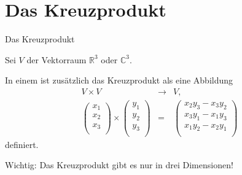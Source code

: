 \documentclass[german]{beamer}
\newcommand{\superalert}[1]{{\color{MyYellowOrange}{#1}}}
\newcommand{\bq}{\begin{eqnarray*}}
\newcommand{\eq}{\end{eqnarray*}}
\begin{document}
\section{Das Kreuzprodukt}

\frame{\sectionpage}

\begin{frame}{Das Kreuzprodukt}

Sei $V$ der Vektorraum ${\mathbb R}^3$ oder ${\mathbb C}^3$. 

In einem \superalert{dreidimensionalen Vektorraum} ist zus\"atzlich das Kreuzprodukt als eine Abbildung
\bq
 V \times V & \rightarrow & V,
 \nonumber \\
 \left( \begin{array}{c} x_1 \\ x_2 \\ x_3 \\ \end{array} \right)
 \times
 \left( \begin{array}{c} y_1 \\ y_2 \\ y_3 \\ \end{array} \right)
  & = &
 \left( \begin{array}{c} x_2 y_3 -x_3 y_2 \\ x_3 y_1 - x_1 y_3 \\ x_1 y_2 - x_2 y_1 \\ \end{array} \right)
\eq
definiert.

\vspace*{5mm} 

\alert{Wichtig}: Das Kreuzprodukt gibt es nur in drei Dimensionen!

\end{frame}
\end{document}
